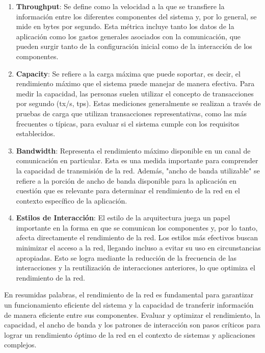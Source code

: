 \documentclass{article}
\begin{document}
 		
 		\begin{enumerate}
 			\item \textbf{Throughput}: Se define como la velocidad a la que se transfiere la información entre los diferentes componentes del sistema y, por lo general, se mide en bytes por segundo. Esta métrica incluye tanto los datos de la aplicación como los gastos generales asociados con la comunicación, que pueden surgir tanto de la configuración inicial como de la interacción de los componentes.
 			
 			\item \textbf{Capacity}: Se refiere a la carga máxima que puede soportar, es decir, el rendimiento máximo que el sistema puede manejar de manera efectiva. Para medir la capacidad, las personas suelen utilizar el concepto de transacciones por segundo (tx/s, tps). Estas mediciones generalmente se realizan a través de pruebas de carga que utilizan transacciones representativas, como las más frecuentes o típicas, para evaluar si el sistema cumple con los requisitos establecidos.	
 			
 			 			
 			\item \textbf{Bandwidth}: Representa el rendimiento máximo disponible en un canal de comunicación en particular. Esta es una medida importante para comprender la capacidad de transmisión de la red. Además, "ancho de banda utilizable" se refiere a la porción de ancho de banda disponible para la aplicación en cuestión que es relevante para determinar el rendimiento de la red en el contexto específico de la aplicación.
 			
 						
 			\item \textbf{Estilos de Interacción}: El estilo de la arquitectura juega un papel importante en la forma en que se comunican los componentes y, por lo tanto, afecta directamente el rendimiento de la red. Los estilos más efectivos buscan minimizar el acceso a la red, llegando incluso a evitar su uso en circunstancias apropiadas. Esto se logra mediante la reducción de la frecuencia de las interacciones y la reutilización de interacciones anteriores, lo que optimiza el rendimiento de la red.
 			
 					 	
 		\end{enumerate}
 		
 		En resumidas palabras, el rendimiento de la red es fundamental para garantizar un funcionamiento eficiente del sistema y la capacidad de transferir información de manera eficiente entre sus componentes. Evaluar y optimizar el rendimiento, la capacidad, el ancho de banda y los patrones de interacción son pasos críticos para lograr un rendimiento óptimo de la red en el contexto de sistemas y aplicaciones complejos.
 		
\end{document}
